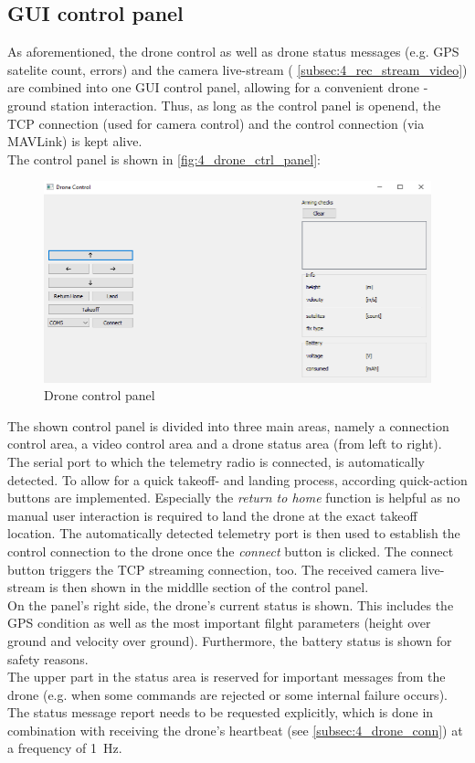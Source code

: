 \subsection{GUI control panel}\label{subsec:4_drone_ctrl_panel_gui}
As aforementioned, the drone control as well as drone status messages (e.g.
GPS satelite count, errors) and the camera live-stream (
\autoref{subsec:4_rec_stream_video}) are combined into one \ac{GUI} control
panel, allowing for a convenient drone - ground station interaction.
Thus, as long as the control panel is openend, the \ac{TCP} connection (used
for camera control) and the control connection (via MAVLink) is kept alive.\\
The control panel is shown in \autoref{fig:4_drone_ctrl_panel}:
\begin{figure}[!h]
    \centering
    \includegraphics[scale=0.6]{drone_control_panel.png}
    \caption[Drone control panel]{Drone control panel}
    \label{fig:4_drone_ctrl_panel}
\end{figure}

\noindent The shown control panel is divided into three main areas, namely a
connection control area, a video control area and a drone status area (from
left to right).
The serial port to which the telemetry radio is connected, is automatically
detected.
To allow for a quick takeoff- and landing process, according quick-action
buttons are implemented.
Especially the \textit{return to home} function is helpful as no manual user
interaction is required to land the drone at the exact takeoff location.
The automatically detected telemetry port is then used to establish the
control connection to the drone once the \textit{connect} button is clicked.
The connect button triggers the \ac{TCP} streaming connection, too.
The received camera live-stream is then shown in the middlle section of the
control panel.\\
On the panel's right side, the drone's current status is shown.
This includes the \ac{GPS} condition as well as the most important filght
parameters (height over ground and velocity over ground).
Furthermore, the battery status is shown for safety reasons.\\
The upper part in the status area is reserved for important messages from the
drone (e.g. when some commands are rejected or some internal failure occurs).
The status message report needs to be requested explicitly, which is done in
combination with receiving the drone's heartbeat (see
\autoref{subsec:4_drone_conn}) at a frequency of 1~Hz.

